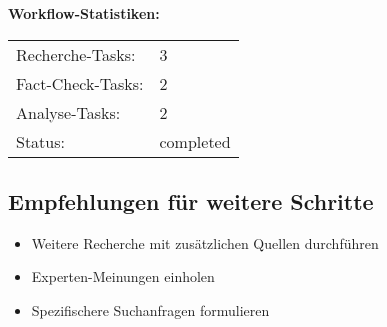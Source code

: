 \documentclass[12pt,a4paper]{article}
\begin{document}
\textbf{Workflow-Statistiken:}
\begin{tabular}{ll}
Recherche-Tasks: & 3 \\
Fact-Check-Tasks: & 2 \\
Analyse-Tasks: & 2 \\
Status: & completed \\
\end{tabular}

\subsection{Empfehlungen für weitere Schritte}

\begin{itemize}
\item Weitere Recherche mit zusätzlichen Quellen durchführen
\item Experten-Meinungen einholen
\item Spezifischere Suchanfragen formulieren
\end{itemize}
\end{document}

